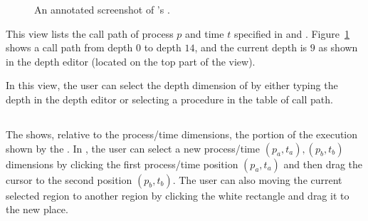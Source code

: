 \begin{figure}[t]
\caption{An annotated screenshot of \hpctraceviewer{}'s \callview.}
\label{fig:hpctraceviewer-callpath-legend}
\end{figure}

This view lists the call path of process $p$ and time $t$ specified in \traceview{} and \depthview.
Figure~\ref{fig:hpctraceviewer-callpath-legend} shows a call path from depth $0$ to depth $14$, and the current depth is $9$ as shown in the depth editor (located on the top part of the view).

In this view, the user can select the depth dimension of \traceview{} by either typing the depth in the depth editor or selecting a procedure in the table of call path.

\subsection{\miniview}
\label{sec:miniview}

The \miniview{} shows, relative to the process/time dimensions, the portion of the execution shown by the \traceview.
In \miniview{}, the user can select a new process/time $(p_a,t_a),(p_b,t_b)$ dimensions by clicking the first process/time position $(p_a,t_a)$ and then drag the cursor to the second position $(p_b,t_b)$.
The user can also moving the current selected region to another region by clicking the white rectangle and drag it to the new place.



